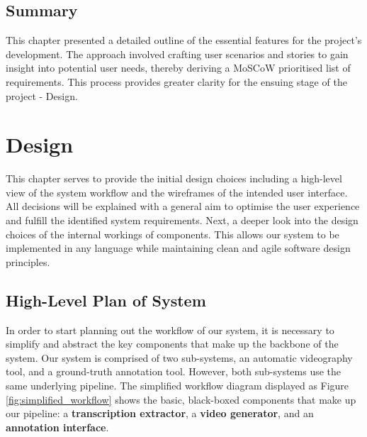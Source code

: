 \documentclass{l4proj}
\begin{document}
\section{Summary}
This chapter presented a detailed outline of the essential features for the project's development. The approach involved crafting user scenarios and stories to gain insight into potential user needs, thereby deriving a MoSCoW prioritised list of requirements. This process provides greater clarity for the ensuing stage of the project - Design.




\chapter{Design}
This chapter serves to provide the initial design choices including a high-level view of the system workflow and the wireframes of the intended user interface. All decisions will be explained with a general aim to optimise the user experience and fulfill the identified system requirements. Next, a deeper look into the design choices of the internal workings of components. This allows our system to be implemented in any language while maintaining clean and agile software design principles. 

\section{High-Level Plan of System}
In order to start planning out the workflow of our system, it is necessary to simplify and abstract the key components that make up the backbone of the system. Our system is comprised of two sub-systems, an automatic videography tool, and a ground-truth annotation tool. However, both sub-systems use the same underlying pipeline. The simplified workflow diagram displayed as Figure \ref{fig:simplified_workflow} shows the basic, black-boxed components that make up our pipeline: a \textbf{transcription extractor}, a \textbf{video generator}, and an \textbf{annotation interface}.
\end{document}
